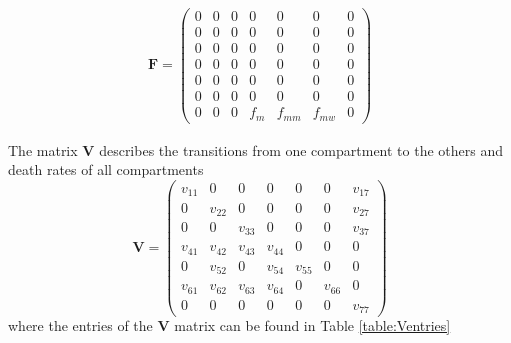 \documentclass{article}
\begin{document}
\begin{align*}
    \mathbf{F} = 
    \begin{pmatrix}
   	 0 & 0 & 0 & 0   & 0 	  & 0 	   & 0 \\
	 0 & 0 & 0 & 0   & 0 	  & 0 	   & 0 \\
	 0 & 0 & 0 & 0   & 0 	  & 0 	   & 0 \\
	 0 & 0 & 0 & 0   & 0      & 0	   & 0 \\
	 0 & 0 & 0 & 0   & 0      & 0      & 0 \\ 
	 0 & 0 & 0 & 0   & 0      & 0      & 0 \\
	 0 & 0 & 0 & f_m & f_{mm} & f_{mw} & 0
    \end{pmatrix}
\end{align*}

The matrix $\mathbf{V}$ describes the transitions from one compartment to the others and death rates of all compartments
\[
    \mathbf{V} = 
    \begin{pmatrix*}
     v_{11}  & 0 & 0 & 0 & 0 & 0 & v_{17} \\
     0  &  v_{22} & 0 & 0 & 0 & 0 & v_{27} \\ 
     0  &  0  &  v_{33} &  0  &  0  &  0  & v_{37} \\
    v_{41}  &  v_{42} & v_{43} &  v_{44} &  0 & 0 & 0 \\
     0 & v_{52}  &  0  & v_{54} &  v_{55} & 0 & 0  \\
     v_{61} & v_{62} & v_{63} & v_{64}  &  0  & v_{66} & 0 \\
     0  &  0  &  0  &  0  &  0  &  0  &  v_{77}
    \end{pmatrix*}
\]
where the entries of the $\mathbf{V}$ matrix can be found in Table \ref{table:Ventries}
\end{document}
